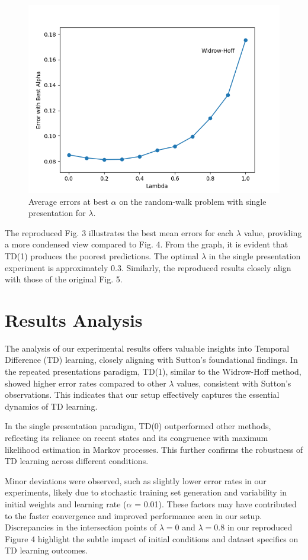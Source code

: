 \documentclass[lettersize,journal]{IEEEtran}
\begin{document}
\begin{figure}[ht]
    \centering
    \includegraphics[width=0.8\linewidth]{figure5.png} 
    \caption{Average errors at best $\alpha$ on the random-walk problem with single presentation for $\lambda$.}
    \label{fig:avg_errors_best_alpha}
\end{figure}

The reproduced Fig. 3 illustrates the best mean errors for each $\lambda$ value, providing a more condensed view compared to Fig. 4. From the graph, it is evident that TD(1) produces the poorest predictions. The optimal $\lambda$ in the single presentation experiment is approximately 0.3. Similarly, the reproduced results closely align with those of the original Fig. 5.

\section{Results Analysis}

The analysis of our experimental results offers valuable insights into Temporal Difference (TD) learning, closely aligning with Sutton's foundational findings. In the repeated presentations paradigm, TD(1), similar to the Widrow-Hoff method, showed higher error rates compared to other $\lambda$ values, consistent with Sutton's observations. This indicates that our setup effectively captures the essential dynamics of TD learning.

In the single presentation paradigm, TD(0) outperformed other methods, reflecting its reliance on recent states and its congruence with maximum likelihood estimation in Markov processes. This further confirms the robustness of TD learning across different conditions.

Minor deviations were observed, such as slightly lower error rates in our experiments, likely due to stochastic training set generation and variability in initial weights and learning rate ($\alpha$ = 0.01). These factors may have contributed to the faster convergence and improved performance seen in our setup. Discrepancies in the intersection points of $\lambda = 0$ and $\lambda = 0.8$ in our reproduced Figure 4 highlight the subtle impact of initial conditions and dataset specifics on TD learning outcomes.
\end{document}
